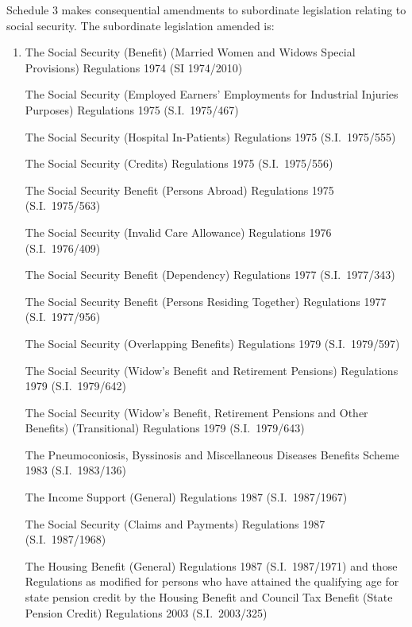 \documentclass[12pt,a4paper]{article}
\begin{document}
Schedule 3 makes consequential amendments to subordinate legislation relating to social security. The subordinate legislation amended is:
\begin{enumerate}\item[]
    The Social Security (Benefit) (Married Women and Widows Special Provisions) Regulations 1974 (SI 1974/2010)

    The Social Security (Employed Earners' Employments for Industrial Injuries Purposes) Regulations 1975 (S.I.\ 1975/467)

    The Social Security (Hospital In-Patients) Regulations 1975 (S.I.\ 1975/555)

    The Social Security (Credits) Regulations 1975 (S.I.\ 1975/556)

    The Social Security Benefit (Persons Abroad) Regulations 1975 (S.I.\ 1975/\hspace{0pt}563)

    The Social Security (Invalid Care Allowance) Regulations 1976 (S.I.\ 1976/\hspace{0pt}409)

    The Social Security Benefit (Dependency) Regulations 1977 (S.I.\ 1977/343)

    The Social Security Benefit (Persons Residing Together) Regulations 1977 (S.I.\ 1977/956)

    The Social Security (Overlapping Benefits) Regulations 1979 (S.I.\ 1979/597)

    The Social Security (Widow’s Benefit and Retirement Pensions) Regulations 1979 (S.I.\ 1979/642)

    The Social Security (Widow’s Benefit, Retirement Pensions and Other Benefits) (Transitional) Regulations 1979 (S.I.\ 1979/643)

\begin{sloppypar}
    The Pneumoconiosis, Byssinosis and Miscellaneous Diseases Benefits Scheme 1983 (S.I.\ 1983/136)
\end{sloppypar}

    The Income Support (General) Regulations 1987 (S.I.\ 1987/1967)

    The Social Security (Claims and Payments) Regulations 1987 (S.I.\ 1987/1968)

    The Housing Benefit (General) Regulations 1987 (S.I.\ 1987/1971) and those Regulations as modified for persons who have attained the qualifying age for state pension credit by the Housing Benefit and Council Tax Benefit (State Pension Credit) Regulations 2003 (S.I.\ 2003/325)


\end{enumerate}
\end{document}
